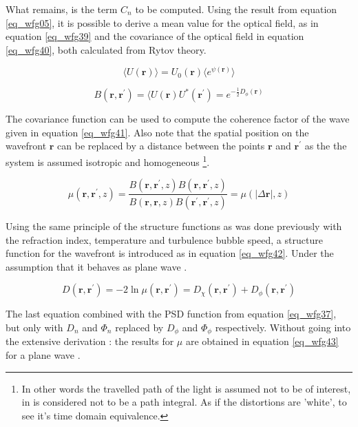\documentclass{article}
\begin{document}
What remains, is the term $C_n$ to be computed. Using the result from equation \ref{eq_wfg05}, it is possible to derive a mean value for the optical field, as in equation \ref{eq_wfg39} and the covariance of the optical field in equation \ref{eq_wfg40}, both calculated from Rytov theory.

\begin{equation}
\langle U(\textbf{r}) \rangle = U_0(\textbf{r})\langle e^{\psi(\textbf{r})} \rangle
\label{eq_wfg39}
\end{equation}

\begin{equation}
B(\textbf{r},\textbf{r}^{'}) = \langle U(\textbf{r}) U^{*}(\textbf{r}^{'}) = e^{-\frac{1}{2} D_\phi(\textbf{r})}
\label{eq_wfg40}
\end{equation}

The covariance function can be used to compute the coherence factor of the wave given in equation \ref{eq_wfg41}. Also note that the spatial position on the wavefront $\textbf{r}$ can be replaced by a distance between the points $\textbf{r}$ and $\textbf{r}^{'}$ as the the system is assumed isotropic and homogeneous \footnote{In other words the travelled path of the light is assumed not to be of interest, in is considered not to be a path integral. As if the distortions are 'white', to see it's time domain equivalence. }. 

\begin{equation}
\mu(\textbf{r},\textbf{r}^{'},z) = \frac{B(\textbf{r},\textbf{r}^{'},z) B(\textbf{r},\textbf{r}^{'},z)}{B(\textbf{r},\textbf{r},z) B(\textbf{r}^{'},\textbf{r}^{'},z)} = \mu(|\Delta \textbf{r}|,z)
\label{eq_wfg41}
\end{equation}

Using the same principle of the structure functions as was done previously with the refraction index, temperature and turbulence bubble speed, a structure function for the wavefront is introduced as in equation \ref{eq_wfg42}. Under the assumption that it behaves as plane wave \cite{lectureNotes}.

\begin{equation}
D(\textbf{r},\textbf{r}^{'}) = -2 \ln \mu(\textbf{r},\textbf{r}^{'}) =  D_\chi(\textbf{r},\textbf{r}^{'}) + D_\phi(\textbf{r},\textbf{r}^{'})
\label{eq_wfg42}
\end{equation}

The last equation combined with the PSD function from equation \ref{eq_wfg37}, but only with $D_n$ and $\Phi_n$ replaced by $D_\phi$ and $\Phi_\phi$ respectively. Without going into the extensive derivation \cite{sasiela2007electromagnetic}: the results for $\mu$ are obtained in equation \ref{eq_wfg43} for a plane wave \cite{zernikeCircle}.
\end{document}
